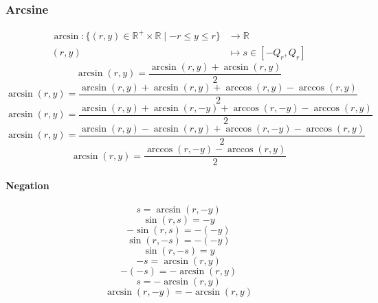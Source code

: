 \documentclass[a4paper,12pt]{report}
\begin{document}
\subsubsection{Arcsine}
\begin{equation}
\begin{aligned}
\arcsin \colon \{(r,y) \in \mathbb{R}^{+} \times \mathbb{R} \mid -r \leq y \leq r\} & \to \mathbb{R} \\
(r,y) & \mapsto s \in \left[-Q_r, Q_r\right]
\end{aligned}
\end{equation}
\begin{equation}
\arcsin(r,y) = \frac{\arcsin(r,y) + \arcsin(r,y)}{2}
\end{equation}
\begin{equation}
\arcsin(r,y) = \frac{\arcsin(r,y) + \arcsin(r,y) + \arccos(r,y) - \arccos(r,y)}{2}
\end{equation}
\begin{equation}
\arcsin(r,y) = \frac{\arcsin(r,y) + \arcsin(r,-y) + \arccos(r,-y) - \arccos(r,y)}{2}
\end{equation}
\begin{equation}
\arcsin(r,y) = \frac{\arcsin(r,y) - \arcsin(r,y) + \arccos(r,-y) - \arccos(r,y)}{2}
\end{equation}
\begin{equation}
\arcsin(r,y) = \frac{\arccos(r,-y) - \arccos(r,y)}{2}
\end{equation}
\paragraph{Negation}
\begin{equation}
s = \arcsin(r,-y)
\end{equation}
\begin{equation}
\sin(r,s) = -y
\end{equation}
\begin{equation}
-\sin(r,s) = -(-y)
\end{equation}
\begin{equation}
\sin(r,-s) = -(-y)
\end{equation}
\begin{equation}
\sin(r,-s) = y
\end{equation}
\begin{equation}
-s = \arcsin(r,y)
\end{equation}
\begin{equation}
-(-s) = -\arcsin(r,y)
\end{equation}
\begin{equation}
s = -\arcsin(r,y)
\end{equation}
\begin{equation}
\arcsin(r,-y) = -\arcsin(r,y)
\end{equation}
\end{document}
